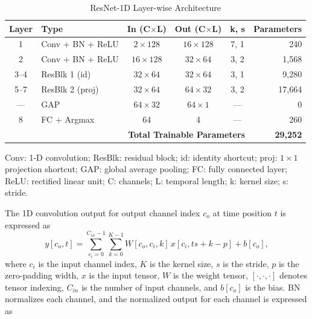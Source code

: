 \documentclass[conference]{IEEEtran}
\begin{document}
\begin{table}[t]
\renewcommand{\arraystretch}{1.15}
\caption{ResNet-1D Layer-wise Architecture}
\label{tab:layerwise}
\centering
\scriptsize
\setlength{\tabcolsep}{3pt}
\begin{tabular}{c l c c c r}
\toprule
\textbf{Layer} & \textbf{Type} & \textbf{In (C$\times$L)} & \textbf{Out (C$\times$L)} & \textbf{k, s} & \textbf{Parameters} \\
\midrule
1 & Conv + BN + ReLU & $2\!\times\!128$ & $16\!\times\!128$ & 7, 1 & 240 \\
2 & Conv + BN + ReLU & $16\!\times\!128$ & $32\!\times\!64$ & 3, 2 & 1,568 \\
3--4 & ResBlk 1 (id) & $32\!\times\!64$ & $32\!\times\!64$ & 3, 1 & 9,280 \\
5--7 & ResBlk 2 (proj) & $32\!\times\!64$ & $64\!\times\!32$ & 3, 2 & 17,664 \\
--- & GAP & $64\!\times\!32$ & $64\!\times\!1$ & --- & 0 \\
8 & FC + Argmax & 64 & 4 & --- & 260 \\
\midrule
 & \multicolumn{4}{r}{\textbf{Total Trainable Parameters}} & \textbf{29,252} \\
\bottomrule
\end{tabular}

\vspace{2pt}
\parbox{\columnwidth}{\scriptsize Conv: 1-D convolution; ResBlk: residual block; id: identity shortcut; proj: $1\times1$ projection shortcut; GAP: global average pooling; FC: fully connected layer; ReLU: rectified linear unit; C: channels; L: temporal length; k: kernel size; s: stride.}
\end{table}
The 1D convolution output for output channel index $c_o$ at time position $t$ is expressed as
\begin{equation}
y[c_o, t] = \sum_{c_i=0}^{C_{in}-1} \sum_{k=0}^{K-1} W[c_o, c_i, k]\, x[c_i, t s + k - p] + b[c_o],
\label{eq:conv1d}
\end{equation}
where $c_i$ is the input channel index, $K$ is the kernel size, $s$ is the stride, $p$ is the zero-padding width, $x$ is the input tensor, $W$ is the weight tensor, $[ \cdot, \cdot,\cdot]$ denotes tensor indexing, $C_{in}$ is the number of input channels, and $b[c_o]$ is the bias. BN normalizes each channel, and the normalized output for each channel is expressed as
\end{document}
